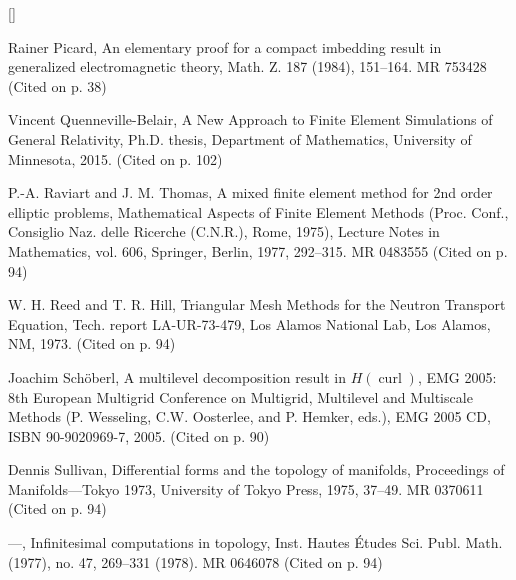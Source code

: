 \begin{list}{[]}{\setlength{\leftmargin}{2.7em}\setlength{\labelwidth}{2.2em}}
\item\label{bib:source-62}Rainer Picard, An elementary proof for a compact imbedding result in generalized electromagnetic theory, Math. Z. 187 (1984), 151–164. MR 753428 (Cited on p. 38)

\item\label{bib:source-63}Vincent Quenneville-Belair, A New Approach to Finite Element Simulations of General Relativity, Ph.D. thesis, Department of Mathematics, University of Minnesota, 2015. (Cited on p. 102)

\item\label{bib:source-64}P.-A. Raviart and J. M. Thomas, A mixed finite element method for 2nd order elliptic problems, Mathematical Aspects of Finite Element Methods (Proc. Conf., Consiglio Naz. delle Ricerche (C.N.R.), Rome, 1975), Lecture Notes in Mathematics, vol. 606, Springer, Berlin, 1977, 292–315. MR 0483555 (Cited on p. 94)

\item\label{bib:source-65}W. H. Reed and T. R. Hill, Triangular Mesh Methods for the Neutron Transport Equation, Tech. report LA-UR-73-479, Los Alamos National Lab, Los Alamos, NM, 1973. (Cited on p. 94)

\item\label{bib:source-66}Joachim Schöberl, A multilevel decomposition result in $H(\operatorname{curl})$, EMG 2005: 8th European Multigrid Conference on Multigrid, Multilevel and Multiscale Methods (P. Wesseling, C.W. Oosterlee, and P. Hemker, eds.), EMG 2005 CD, ISBN 90-9020969-7, 2005. (Cited on p. 90)

\item\label{bib:source-67}Dennis Sullivan, Differential forms and the topology of manifolds, Proceedings of Manifolds—Tokyo 1973, University of Tokyo Press, 1975, 37–49. MR 0370611 (Cited on p. 94)

\item\label{bib:source-68}—, Infinitesimal computations in topology, Inst. Hautes Études Sci. Publ. Math. (1977), no. 47, 269–331 (1978). MR 0646078 (Cited on p. 94)


\end{list}
